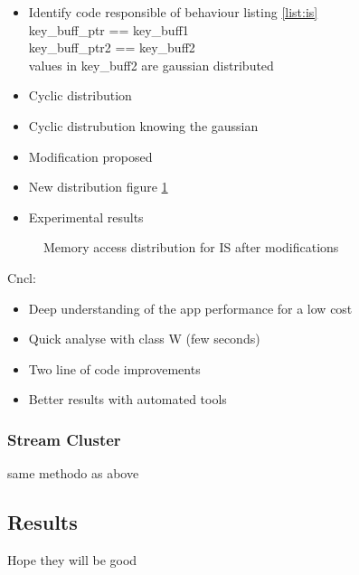 \begin{itemize}
    \item Identify code responsible of behaviour listing \ref{list:is}\\
        key\_buff\_ptr ==  key\_buff1 \\
        key\_buff\_ptr2 == key\_buff2 \\
        values in key\_buff2 are gaussian distributed
    \item Cyclic distribution
    \item Cyclic distrubution knowing the gaussian
    \item Modification proposed
    \item New distribution figure \ref{fig:is-behaviour-new}
    \item Experimental results
\end{itemize}

\begin{figure}[htb]
    \centering
    \caption{Memory access distribution for IS after modifications}
    \label{fig:is-behaviour-new}
\end{figure}

Cncl:

\begin{itemize}
    \item Deep understanding of the app performance for a low cost
    \item Quick analyse with class W (few seconds)
    \item Two line of code improvements
    \item Better results with automated tools 
\end{itemize}

\subsubsection{Stream Cluster}
same methodo as above
\subsection{Results}
\label{sec:expe-results}
Hope they will be good


